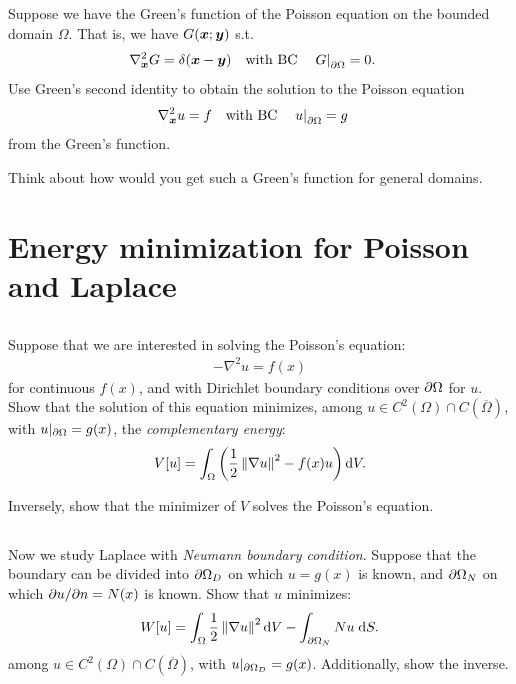 \documentclass[11pt,letterpaper]{report}
\begin{document}
\subsection{}
Suppose we have the Green's function of the Poisson equation on the bounded domain $\Omega$. That is, we have $G(\boldsymbol{x};\boldsymbol{y})$ s.t.
\begin{align}
    &\nabla_{\boldsymbol{x}}^2 G = \delta(\boldsymbol{x}-\boldsymbol{y})\quad \mbox{with BC} \quad \left.G\right|_{\partial\Omega} = 0.
\end{align}
Use Green's second identity to obtain the solution to the Poisson equation
\begin{align}
    &\nabla_{\boldsymbol{x}}^2 u = f\quad \mbox{with BC} \quad \left.u\right|_{\partial\Omega} = g
\end{align}
from the Green's function.

Think about how would you get such a Green's function for general domains. 

\section{Energy minimization for Poisson and Laplace}
\subsection{} Suppose that we are interested in solving the Poisson's equation:
\begin{align}
    -\nabla^2 u = f(x)
\end{align}
for continuous $f(x)$, and with Dirichlet boundary conditions over $\partial\Omega$ for $u$. Show that the solution of this equation minimizes, among $u\in C^2(\Omega)\cap C(\overline{\Omega})$, with $u|_{\partial\Omega} = g(x)$, the \emph{complementary energy}:
\begin{align}
    V[u] = \int_\Omega \left(\frac{1}{2}\left\Vert \nabla u \right\Vert^2-f(x)u\right)\mathrm{d} V. 
\end{align}

Inversely, show that the minimizer of $V$ solves the Poisson's equation.

\subsection{}
Now we study Laplace with \emph{Neumann boundary condition}. Suppose that the boundary can be divided into $\partial\Omega_D$ on which $u = g(x)$ is known, and $\partial\Omega_N$ on
which $\partial u/\partial n = N(x)$ is known. Show that $u$ minimizes:
\begin{align}
    W[u] = \int_\Omega \frac{1}{2}\left\Vert \nabla u \right\Vert^2\mathrm{d} V-\int_{\partial\Omega_N} Nu\;\mathrm{d} S. 
\end{align}
among $u\in C^2(\Omega)\cap C(\overline{\Omega})$, with $u|_{\partial\Omega_D} = g(x)$. Additionally, show the inverse.


\newpage
\printbibliography
\end{document}
